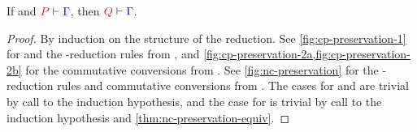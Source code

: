 \begin{theorem}[Preservation]\label{thm:nc-preservation}
  If  and $\seq[{ P }]{ \Gamma }$, then $\seq[{ Q }]{ \Gamma }$.
\end{theorem}
\begin{proof}
  By induction on the structure of the reduction. See
  \cref{fig:cp-preservation-1} for  and the \textbeta-reduction
  rules from \cp, and \cref{fig:cp-preservation-2a,fig:cp-preservation-2b} for the
  commutative conversions from \cp.
  See \cref{fig:nc-preservation} for the \textbeta-reduction rules and
  commutative conversions from \nc.
  The cases for \cpRedGammaCut and \ncRedGammaPool are trivial by call to the
  induction hypothesis, and the case for \cpRedGammaEquiv is trivial by call to
  the induction hypothesis and \cref{thm:nc-preservation-equiv}.
\end{proof}
